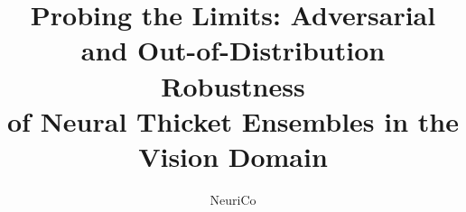\documentclass{article}
\title{Probing the Limits: Adversarial and Out-of-Distribution Robustness\\of Neural Thicket Ensembles in the Vision Domain}
\author{NeuriCo}
\begin{document}
\maketitle

\begin{abstract}

\end{abstract}










\end{document}
